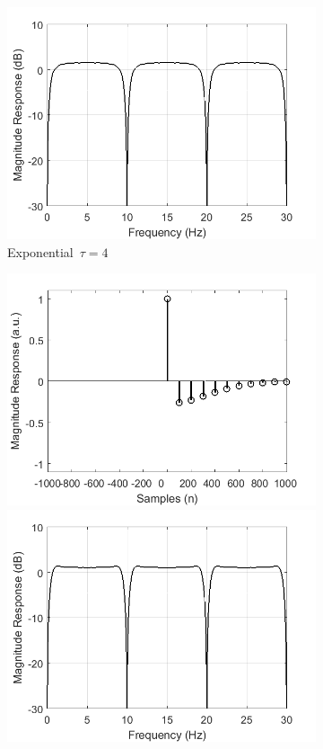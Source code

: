 \documentclass[a4paper]{article}
\begin{document}
\begin{figure}[hbtp]
\begin{subfigure}{.16\textwidth}
        \includegraphics[width=\textwidth]{img/causal/mag_exp.png}
        \caption{\scriptsize{Exponential~$\tau=4$}}\label{fig:ExponentialKernel}
    \end{subfigure}
    \begin{subfigure}{.16\textwidth}
        \includegraphics[width=\textwidth]{img/causal/kernel_gauss.png}\\
        \includegraphics[width=\textwidth]{img/causal/mag_gauss.png}

\end{subfigure}
\end{figure}
\end{document}
